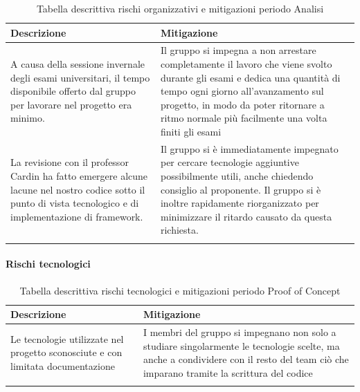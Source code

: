 \begin{center}


    \begin{xltabular}{\textwidth}{| X | X |}
                
        \textbf{\color{white} Descrizione} & \textbf{\color{white} Mitigazione}\\ 
        \endhead
    
        A causa della sessione invernale degli esami universitari, il tempo disponibile offerto dal gruppo per lavorare nel progetto era minimo. &
        Il gruppo si impegna a non arrestare completamente il lavoro che viene svolto durante gli esami e dedica una quantità di tempo ogni giorno
        all'avanzamento sul progetto, in modo da poter ritornare a ritmo normale più facilmente una volta finiti gli esami \\
        \hline

        La revisione con il professor Cardin ha fatto emergere alcune lacune nel nostro codice sotto il punto di vista tecnologico e di implementazione di framework. &
        Il gruppo si è immediatamente impegnato per cercare tecnologie aggiuntive possibilmente utili, anche chiedendo consiglio al proponente. Il gruppo si è inoltre
        rapidamente riorganizzato per minimizzare il ritardo causato da questa richiesta. \\
        \hline
            
        \caption{Tabella descrittiva rischi organizzativi e mitigazioni periodo Analisi}\label{tab:rischi_organizzativi_poc}
    \end{xltabular}
\end{center}

\paragraph{Rischi tecnologici}

\begin{center}
    \begin{xltabular}{\textwidth}{| X | X |}
                
        \textbf{\color{white} Descrizione} & \textbf{\color{white} Mitigazione}\\ 
        \endhead
    
        Le tecnologie utilizzate nel progetto sconosciute e con limitata documentazione &
        I membri del gruppo si impegnano non solo a studiare singolarmente le tecnologie scelte, ma anche a condividere con il resto del team ciò che imparano
        tramite la scrittura del codice \\
        \hline
            
        \caption{Tabella descrittiva rischi tecnologici e mitigazioni periodo Proof of Concept}\label{tab:rischi_tecnologici_poc}
    \end{xltabular}
\end{center}

